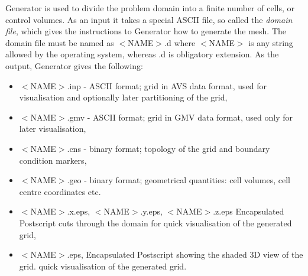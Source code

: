 \documentclass[10pt]{article}
\newcommand*{\tc}{\ttfamily} %
\newcommand*{\tn}{\sffamily} %
\begin{document}
    {\tn Generator} is used to divide the problem domain into 
    a finite number of cells, or control volumes. As an input
    it takes a special ASCII file, so called the {\em domain file},
    which gives the instructions to {\tn Generator} how to generate
    the mesh. The domain file must be named as {\tc $<$NAME$>$.d}
    where {\tc $<$NAME$>$} is any string allowed by the operating
    system, whereas {\tc .d} is obligatory extension.
    As the output, {\tn Generator} gives the following:
    \begin{itemize}
      \item {\tc $<$NAME$>$.inp} - ASCII format; grid in AVS data 
            format, used for
            visualisation and optionally later partitioning of the
            grid,
      \item {\tc $<$NAME$>$.gmv} - ASCII format; grid in GMV data format, used
            only for later visualisation,
      \item {\tc $<$NAME$>$.cns} - binary format; topology of
            the grid and boundary condition markers,
      \item {\tc $<$NAME$>$.geo} - binary format; geometrical
            quantities: cell volumes, cell centre coordinates etc.\,
      \item {\tc $<$NAME$>$.x.eps}, {\tc $<$NAME$>$.y.eps}, {\tc $<$NAME$>$.z.eps}
            Encapsulated Postscript cuts through the domain for
            quick visualisation of the generated grid,
      \item {\tc $<$NAME$>$.eps},
            Encapsulated Postscript showing the shaded 3D view of the 
            grid. 
            quick visualisation of the generated grid.
    \end{itemize}

\end{document}
